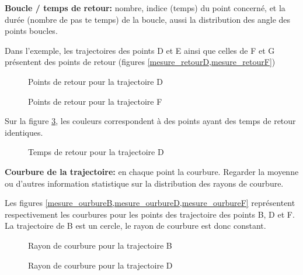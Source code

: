 \documentclass[11pt,a4paper]{article}
\begin{document}
\textbf{Boucle / temps de retour:} nombre, indice (temps) du point concerné, et la durée (nombre de pas te temps) de la boucle, aussi la distribution des angle des points boucles.

Dans l'exemple, les trajectoires des points D et E ainsi que celles de F et G présentent des points de retour (figures \cref{mesure_retourD,mesure_retourF})

\begin{figure}[H] 
\caption{Points de retour pour la trajectoire D}
\label{mesure_retourD}
\end{figure}

\begin{figure}[H] 
\caption{Points de retour pour la trajectoire F}
\label{mesure_retourF}
\end{figure}


Sur la figure \ref{mesure_retourD_color}, les couleurs correspondent à des points ayant des temps de retour identiques.

\begin{figure}[H] 
\caption{Temps de retour pour la trajectoire D}
\label{mesure_retourD_color}
\end{figure}




\textbf{Courbure de la trajectoire:} en chaque point la courbure. Regarder la moyenne ou d'autres information statistique sur la distribution des rayons de courbure. %


Les figures \cref{mesure_ourbureB,mesure_ourbureD,mesure_ourbureF} représentent respectivement les courbures pour les points des trajectoire des points B, D et F. La trajectoire de B est un cercle, le rayon de courbure est donc constant.


\begin{figure}[H] 
\caption{Rayon de courbure pour la trajectoire B}
\label{mesure_ourbureB}
\end{figure}


\begin{figure}[H] 
\caption{Rayon de courbure pour la trajectoire D}
\label{mesure_ourbureD}
\end{figure}
\end{document}
